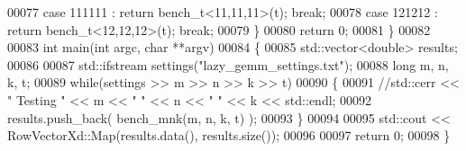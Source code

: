 \begin{DoxyCode}
00077     \textcolor{keywordflow}{case} 111111 : \textcolor{keywordflow}{return} bench\_t<11,11,11>(t); \textcolor{keywordflow}{break};
00078     \textcolor{keywordflow}{case} 121212 : \textcolor{keywordflow}{return} bench\_t<12,12,12>(t); \textcolor{keywordflow}{break};
00079   \}
00080   \textcolor{keywordflow}{return} 0;
00081 \}
00082 
00083 \textcolor{keywordtype}{int} main(\textcolor{keywordtype}{int} argc, \textcolor{keywordtype}{char} **argv)
00084 \{
00085   std::vector<double> results;
00086   
00087   std::ifstream settings(\textcolor{stringliteral}{"lazy\_gemm\_settings.txt"});
00088   \textcolor{keywordtype}{long} m, n, k, t;
00089   \textcolor{keywordflow}{while}(settings >> m >> n >> k >> t)
00090   \{
00091     \textcolor{comment}{//std::cerr << "  Testing " << m << " " << n << " " << k << std::endl;}
00092     results.push\_back( bench\_mnk(m, n, k, t) );
00093   \}
00094   
00095   std::cout << RowVectorXd::Map(results.data(), results.size());
00096   
00097   \textcolor{keywordflow}{return} 0;
00098 \}
\end{DoxyCode}
